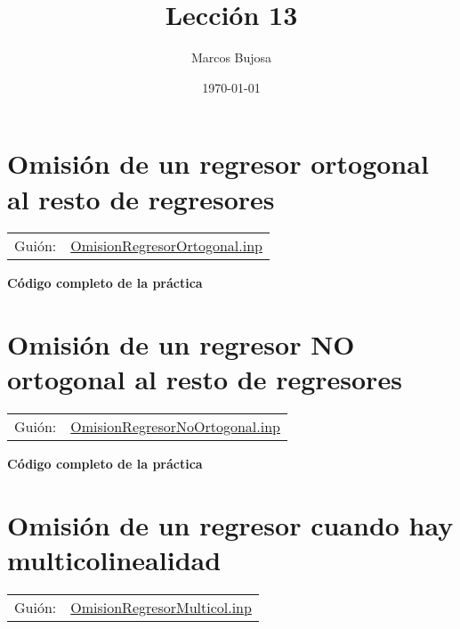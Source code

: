 \documentclass[11pt]{article}
\author{Marcos Bujosa}
\date{\today}
\title{Lección 13}
\begin{document}
\maketitle
\tableofcontents

\clearpage

\section{Omisión de un regresor ortogonal al resto de regresores}
\label{sec:orgabb0ca9}
\begin{center}
\begin{tabular}{ll}
Guión: & \href{https://github.com/mbujosab/Ectr/tree/master/Practicas/Gretl/scripts/OmisionRegresorOrtogonal.inp}{OmisionRegresorOrtogonal.inp}\\[0pt]
\end{tabular}
\end{center}


\vspace{10pt}
\noindent
\textbf{Código completo de la práctica}
\vspace{10pt}

\clearpage

\section{Omisión de un regresor NO ortogonal al resto de regresores}
\label{sec:org3ff717a}
\begin{center}
\begin{tabular}{ll}
Guión: & \href{https://github.com/mbujosab/Ectr/tree/master/Practicas/Gretl/scripts/OmisionRegresorNoOrtogonal.inp}{OmisionRegresorNoOrtogonal.inp}\\[0pt]
\end{tabular}
\end{center}


\vspace{10pt}
\noindent
\textbf{Código completo de la práctica}
\vspace{10pt}

\clearpage

\section{Omisión de un regresor cuando hay multicolinealidad}
\label{sec:org1b7e7b9}
\begin{center}
\begin{tabular}{ll}
Guión: & \href{https://github.com/mbujosab/Ectr/tree/master/Practicas/Gretl/scripts/OmisionRegresorMulticol.inp}{OmisionRegresorMulticol.inp}\\[0pt]
\end{tabular}
\end{center}
\end{document}
